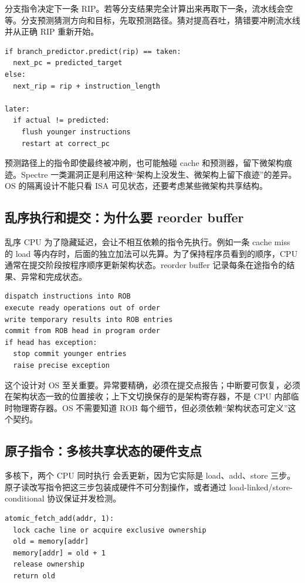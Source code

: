 分支指令决定下一条 RIP。若等分支结果完全计算出来再取下一条，流水线会空等。分支预测猜测方向和目标，先取预测路径。猜对提高吞吐，猜错要冲刷流水线并从正确 RIP 重新开始。

\begin{lstlisting}
if branch_predictor.predict(rip) == taken:
  next_pc = predicted_target
else:
  next_rip = rip + instruction_length

later:
  if actual != predicted:
    flush younger instructions
    restart at correct_pc
\end{lstlisting}

预测路径上的指令即使最终被冲刷，也可能触碰 cache 和预测器，留下微架构痕迹。Spectre 一类漏洞正是利用这种“架构上没发生、微架构上留下痕迹”的差异。OS 的隔离设计不能只看 ISA 可见状态，还要考虑某些微架构共享结构。

\subsection{乱序执行和提交：为什么要 reorder buffer}

乱序 CPU 为了隐藏延迟，会让不相互依赖的指令先执行。例如一条 cache miss 的 load 等内存时，后面的独立加法可以先算。为了保持程序员看到的顺序，CPU 通常在提交阶段按程序顺序更新架构状态。reorder buffer 记录每条在途指令的结果、异常和完成状态。

\begin{lstlisting}
dispatch instructions into ROB
execute ready operations out of order
write temporary results into ROB entries
commit from ROB head in program order
if head has exception:
  stop commit younger entries
  raise precise exception
\end{lstlisting}

这个设计对 OS 至关重要。异常要精确，必须在提交点报告；中断要可恢复，必须在架构状态一致的位置接收；上下文切换保存的是架构寄存器，不是 CPU 内部临时物理寄存器。OS 不需要知道 ROB 每个细节，但必须依赖“架构状态可定义”这个契约。

\subsection{原子指令：多核共享状态的硬件支点}

多核下，两个 CPU 同时执行  会丢更新，因为它实际是 load、add、store 三步。原子读改写指令把这三步包装成硬件不可分割操作，或者通过 load-linked/store-conditional 协议保证并发检测。

\begin{lstlisting}
atomic_fetch_add(addr, 1):
  lock cache line or acquire exclusive ownership
  old = memory[addr]
  memory[addr] = old + 1
  release ownership
  return old
\end{lstlisting}

